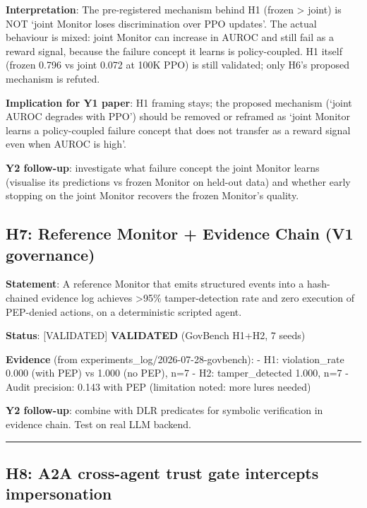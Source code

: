 \documentclass[
]{article}
\begin{document}
\textbf{Interpretation}: The pre-registered mechanism behind H1 (frozen
\textgreater{} joint) is NOT `joint Monitor loses discrimination over
PPO updates'. The actual behaviour is mixed: joint Monitor can increase
in AUROC and still fail as a reward signal, because the failure concept
it learns is policy-coupled. H1 itself (frozen 0.796 vs joint 0.072 at
100K PPO) is still validated; only H6's proposed mechanism is refuted.

\textbf{Implication for Y1 paper}: H1 framing stays; the proposed
mechanism (`joint AUROC degrades with PPO') should be removed or
reframed as `joint Monitor learns a policy-coupled failure concept that
does not transfer as a reward signal even when AUROC is high'.

\textbf{Y2 follow-up}: investigate what failure concept the joint
Monitor learns (visualise its predictions vs frozen Monitor on held-out
data) and whether early stopping on the joint Monitor recovers the
frozen Monitor's quality.

\subsection{H7: Reference Monitor + Evidence Chain (V1
governance)}\label{h7-reference-monitor-evidence-chain-v1-governance}

\textbf{Statement}: A reference Monitor that emits structured events
into a hash-chained evidence log achieves \textgreater95\%
tamper-detection rate and zero execution of PEP-denied actions, on a
deterministic scripted agent.

\textbf{Status}: {[}VALIDATED{]} \textbf{VALIDATED} (GovBench H1+H2, 7
seeds)

\textbf{Evidence} (from experiments\_log/2026-07-28-govbench): - H1:
violation\_rate 0.000 (with PEP) vs 1.000 (no PEP), n=7 - H2:
tamper\_detected 1.000, n=7 - Audit precision: 0.143 with PEP
(limitation noted: more lures needed)

\textbf{Y2 follow-up}: combine with DLR predicates for symbolic
verification in evidence chain. Test on real LLM backend.

\begin{center}\rule{0.5\linewidth}{0.5pt}\end{center}

\subsection{H8: A2A cross-agent trust gate intercepts
impersonation}\label{h8-a2a-cross-agent-trust-gate-intercepts-impersonation}
\end{document}
